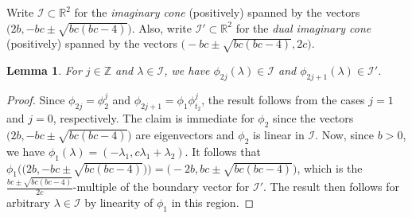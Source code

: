 \documentclass{amsart}
\newtheorem{lemma}[theorem]{Lemma}
\numberwithin{theorem}{section}
\newcommand{\cI}{\mathcal{I}}
\newcommand{\RR}{\mathbb{R}}
\newcommand{\ZZ}{\mathbb{Z}}
\begin{document}
  Write $\cI \subset \RR^2$ for the \emph{imaginary cone} (positively) spanned by the vectors $\big(2b,-bc\pm\sqrt{bc(bc-4)}\big)$.
  Also, write $\cI' \subset \RR^2$ for the \emph{dual imaginary cone} (positively) spanned by the vectors $\big(-bc\pm\sqrt{bc(bc-4)},2c\big)$.
  \begin{lemma}
    \label{le:imaginary stability}
    For $j\in\ZZ$ and $\lambda\in\cI$, we have $\phi_{2j}(\lambda)\in\cI$ and $\phi_{2j+1}(\lambda)\in\cI'$.
  \end{lemma}
  \begin{proof}
    Since $\phi_{2j}=\phi_2^j$ and $\phi_{2j+1}=\phi_1\phi_{t_2}^j$, the result follows from the cases $j=1$ and $j=0$, respectively.
    The claim is immediate for $\phi_2$ since the vectors $\big(2b,-bc\pm\sqrt{bc(bc-4)}\big)$ are eigenvectors and $\phi_2$ is linear in $\cI$.
    Now, since $b>0$, we have $\phi_1(\lambda)=(-\lambda_1,c\lambda_1+\lambda_2)$.
    It follows that $\phi_1\Big( \big(2b,-bc\pm\sqrt{bc(bc-4)}\big) \Big)=\big(-2b,bc\pm\sqrt{bc(bc-4)}\big)$, which is the $\frac{bc\pm\sqrt{bc(bc-4)}}{2c}$-multiple of the boundary vector for $\cI'$.
    The result then follows for arbitrary $\lambda\in\cI$ by linearity of $\phi_1$ in this region.
  \end{proof}
\end{document}
